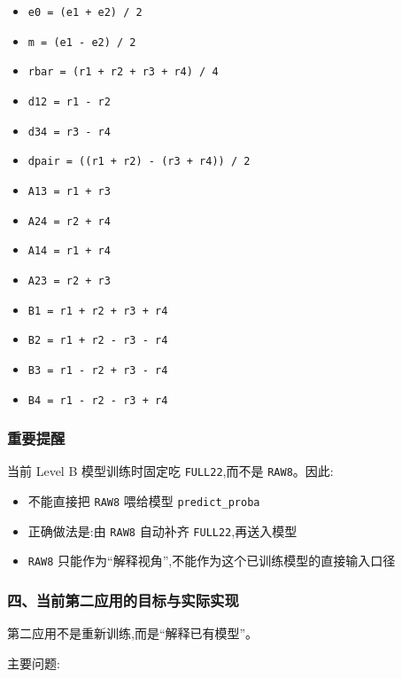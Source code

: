 \documentclass[lang=cn,scheme=chinese,color=blue,device=normal,toc=onecol,math=cm]{elegantbook}
\begin{document}
\begin{itemize}
\item \texttt{e0    = (e1 + e2) /\allowbreak{} 2}
\item \texttt{m     = (e1 - e2) /\allowbreak{} 2}
\item \texttt{rbar  = (r1 + r2 + r3 + r4) /\allowbreak{} 4}
\item \texttt{d12   = r1 - r2}
\item \texttt{d34   = r3 - r4}
\item \texttt{dpair = ((r1 + r2) - (r3 + r4)) /\allowbreak{} 2}
\item \texttt{A13   = r1 + r3}
\item \texttt{A24   = r2 + r4}
\item \texttt{A14   = r1 + r4}
\item \texttt{A23   = r2 + r3}
\item \texttt{B1    = r1 + r2 + r3 + r4}
\item \texttt{B2    = r1 + r2 - r3 - r4}
\item \texttt{B3    = r1 - r2 + r3 - r4}
\item \texttt{B4    = r1 - r2 - r3 + r4}
\end{itemize}


\subsubsection{重要提醒}


当前 Level B 模型训练时固定吃 \texttt{FULL22},而不是 \texttt{RAW8}。因此:\par


\begin{itemize}
\item 不能直接把 \texttt{RAW8} 喂给模型 \texttt{predict\_\allowbreak{}proba}
\item 正确做法是:由 \texttt{RAW8} 自动补齐 \texttt{FULL22},再送入模型
\item \texttt{RAW8} 只能作为“解释视角”,不能作为这个已训练模型的直接输入口径
\end{itemize}


\subsubsection{四、当前第二应用的目标与实际实现}


第二应用不是重新训练,而是“解释已有模型”。\par


主要问题:\par
\end{document}
